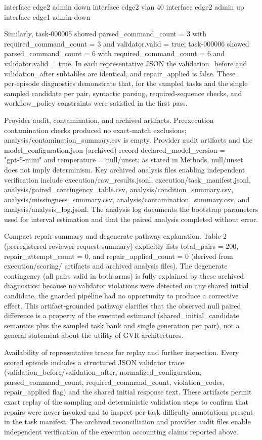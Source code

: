 \documentclass[conference]{IEEEtran}
\begin{document}
interface edge2 admin down
interface edge2 vlan 40
interface edge2 admin up
interface edge1 admin down

Similarly, task‑000005 showed parsed\_command\_count = 3 with required\_command\_count = 3 and validator.valid = true; task‑000006 showed parsed\_command\_count = 6 with required\_command\_count = 6 and validator.valid = true. In each representative JSON the validation\_before and validation\_after subtables are identical, and repair\_applied is false. These per‑episode diagnostics demonstrate that, for the sampled tasks and the single sampled candidate per pair, syntactic parsing, required‑sequence checks, and workflow\_policy constraints were satisfied in the first pass.

Provider audit, contamination, and archived artifacts. Preexecution contamination checks produced no exact‑match exclusions; analysis/contamination\_summary.csv is empty. Provider audit artifacts and the model\_configuration.json (archived) record declared\_model\_version = "gpt‑5‑mini" and temperature = null/unset; as stated in Methods, null/unset does not imply determinism. Key archived analysis files enabling independent verification include execution/raw\_results.jsonl, execution/task\_manifest.jsonl, analysis/paired\_contingency\_table.csv, analysis/condition\_summary.csv, analysis/missingness\_summary.csv, analysis/contamination\_summary.csv, and analysis/analysis\_log.jsonl. The analysis log documents the bootstrap parameters used for interval estimation and that the paired analysis completed without error.

Compact repair summary and degenerate pathway explanation. Table 2 (preregistered reviewer request summary) explicitly lists total\_pairs = 200, repair\_attempt\_count = 0, and repair\_applied\_count = 0 (derived from execution/scoring/ artifacts and archived analysis files). The degenerate contingency (all pairs valid in both arms) is fully explained by these archived diagnostics: because no validator violations were detected on any shared initial candidate, the guarded pipeline had no opportunity to produce a corrective effect. This artifact‑grounded pathway clarifies that the observed null paired difference is a property of the executed estimand (shared\_initial\_candidate semantics plus the sampled task bank and single generation per pair), not a general statement about the utility of GVR architectures.

Availability of representative traces for replay and further inspection. Every scored episode includes a structured JSON validator trace (validation\_before/validation\_after, normalized\_configuration, parsed\_command\_count, required\_command\_count, violation\_codes, repair\_applied flag) and the shared initial response text. These artifacts permit exact replay of the sampling and deterministic validation steps to confirm that repairs were never invoked and to inspect per‑task difficulty annotations present in the task manifest. The archived reconciliation and provider audit files enable independent verification of the execution accounting claims reported above.
\end{document}
